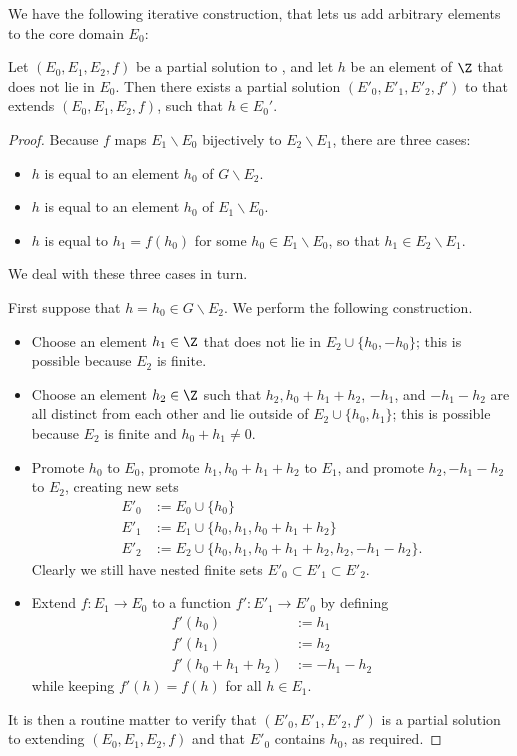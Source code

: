 We have the following iterative construction, that lets us add arbitrary elements to the core domain $E_0$:

\begin{lemma}\label{iteration} Let $(E_0, E_1, E_2, f)$ be a partial solution to , and let $h$ be an element of $\Z$ that does not lie in $E_0$.  Then there exists a partial solution $(E'_0, E'_1, E'_2, f')$ to  that extends $(E_0, E_1, E_2, f)$, such that $h \in E_0'$.
\end{lemma}

\begin{proof}  Because $f$ maps $E_1 \backslash E_0$ bijectively to $E_2 \backslash E_1$, there are three cases:
\begin{itemize}
  \item $h$ is equal to an element $h_0$ of $G \backslash E_2$.
  \item $h$ is equal to an element $h_0$ of $E_1 \backslash E_0$.
  \item $h$ is equal to $h_1 = f(h_0)$ for some $h_0 \in E_1 \backslash E_0$, so that $h_1 \in E_2 \backslash E_1$.
\end{itemize}

We deal with these three cases in turn.

First suppose that $h = h_0\in G \backslash E_2$.  We perform the following construction.

\begin{itemize}
  \item Choose an element $h_1 \in \Z$ that does not lie in $E_2 \cup \{h_0, -h_0\}$; this is possible because $E_2$ is finite.
  \item Choose an element $h_2 \in \Z$ such that $h_2, h_0+h_1+h_2$, $-h_1$, and $-h_1-h_2$ are all distinct from each other and lie outside of $E_2 \cup \{h_0, h_1\}$; this is possible because $E_2$ is finite and $h_0+h_1 \neq 0$.
  \item Promote $h_0$ to $E_0$, promote $h_1, h_0+h_1+h_2$ to $E_1$, and promote $h_2, -h_1-h_2$ to $E_2$, creating new sets
  \begin{align*}
    E'_0 &:= E_0 \cup \{h_0\} \\
    E'_1 &:= E_1 \cup \{h_0, h_1, h_0+h_1+h_2\} \\
    E'_2 &:= E_2 \cup \{h_0, h_1, h_0+h_1+h_2, h_2, -h_1-h_2\}.
  \end{align*}
  Clearly we still have nested finite sets $E'_0 \subset E'_1 \subset E'_2$.
  \item Extend $f : E_1 \to E_0$ to a function $f': E'_1 \to E'_0$ by defining
  \begin{align*}
    f'(h_0) &:= h_1 \\
    f'(h_1) &:= h_2 \\
    f'(h_0+h_1+h_2) &:= -h_1-h_2
  \end{align*}
  while keeping $f'(h)=f(h)$ for all $h \in E_1$.
\end{itemize}
It is then a routine matter to verify that $(E'_0,E'_1,E'_2,f')$ is a partial solution to  extending $(E_0,E_1,E_2,f)$ and that $E'_0$ contains $h_0$, as required.


\end{proof}
